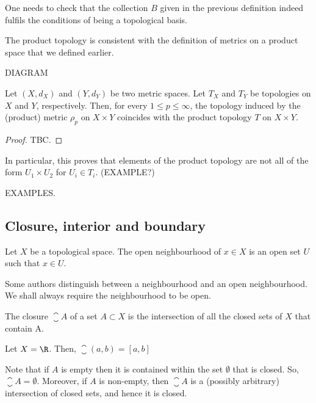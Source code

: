 \begin{remark}
  One needs to check that the collection $B$ given in the previous definition indeed fulfils the conditions of being a topological basis.
\end{remark}

The product topology is consistent with the definition of metrics on a product space that we defined earlier.

DIAGRAM

\begin{nthm}
  Let $(X,d_X)$ and $(Y,d_Y)$ be two metric spaces. Let $T_X$ and $T_Y$ be topologies on $X$ and $Y$, respectively. Then, for every $1 \leq p \leq \infty$, the topology induced by the (product) metric $\rho_p$ on $X \times Y$ coincides with the product topology $T$ on $X \times Y$.
\end{nthm}
\begin{proof}
  TBC.
\end{proof}

In particular, this proves that elements of the product topology are not all of the form $U_1 \times U_2$ for $U_i \in T_i$. (EXAMPLE?)

EXAMPLES.

\subsection{Closure, interior and boundary}
\begin{ndfn}[Neighbourhood]
  Let $X$ be a topological space. The open neighbourhood of $x \in X$ is an open set $U$ such that $x \in U$.
\end{ndfn}
Some authors distinguish between a neighbourhood and an open neighbourhood. We shall always require the neighbourhood to be open.

\begin{ndfn}[Closure]
  The closure $\closure{A}$ of a set $A \subset X$ is the intersection of all the closed sets of $X$ that contain A.
\end{ndfn}

\begin{negg}
  Let $X=\R$. Then, $\closure{(a,b)} = [a,b]$
\end{negg}

Note that if $A$ is empty then it is contained within the set $\emptyset$ that is closed. So, $\closure{A} = \emptyset$. Moreover, if $A$ is non-empty, then $\closure{A}$ is a (possibly arbitrary) intersection of closed sets, and hence it is closed.

